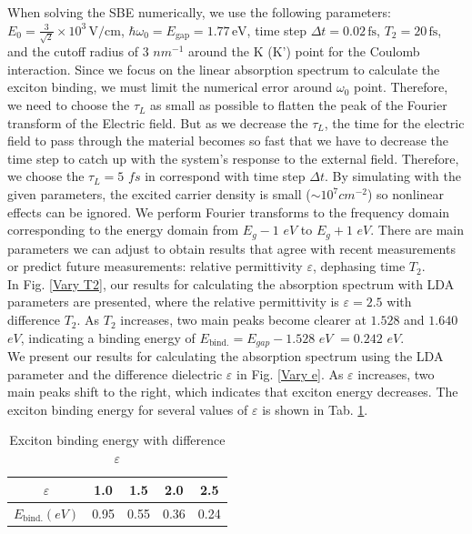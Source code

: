 \documentclass[12pt,english,a4paper]{article}
\begin{document}
\quad When solving the SBE numerically, we use the following parameters: \(E_0 = \frac{3}{\sqrt{2}} \times 10^3 \, \text{V/cm}\), \(\hbar \omega_0 = E_{\text{gap}} = 1.77 \, \text{eV}\), time step \(\Delta t = 0.02 \, \text{fs}\), $ T_2= 20\, \text{fs}$, and the cutoff radius of 3 \(nm^{-1}\) around the K (K') point for the Coulomb interaction. Since we focus on the linear absorption spectrum to calculate the exciton binding, we must limit the numerical error around $\omega_0$ point. Therefore, we need to choose the $\tau_L$ as small as possible to flatten the peak of the Fourier transform of the Electric field. But as we decrease the $\tau_L$, the time for the electric field to pass through the material becomes so fast that we have to decrease the time step to catch up with the system's response to the external field. Therefore, we choose the $\tau_L = 5$ \(fs\) in correspond with time step $\Delta t$. By simulating with the given parameters, the excited carrier density is small ($\sim 10^7 cm^{-2}$) so nonlinear effects can be ignored. We perform Fourier transforms to the frequency domain corresponding to the energy domain from $E_g - 1$ \(eV\) to $E_g + 1$ \(eV\). There are main parameters we can adjust to obtain results that agree with recent measurements or predict future measurements: relative permittivity \(\varepsilon\), dephasing time \(T_2\).\\\null
\quad In Fig. \ref{Vary T2}, our results for calculating the absorption spectrum with LDA parameters are presented, where the relative permittivity is $\varepsilon = 2.5$ with difference $T_2$. As $T_2$ increases, two main peaks become clearer at $1.528$ and $1.640$ \(eV\), indicating a binding energy of $E_{\mathrm{bind.}} = E_{gap} - 1.528$ \(eV\) $= 0.242$ \(eV\).\\ \null
\quad We present our results for calculating the absorption spectrum using the LDA parameter and the difference dielectric $\varepsilon$ in Fig. \ref{Vary e}. As $\varepsilon$ increases, two main peaks shift to the right, which indicates that exciton energy decreases. The exciton binding energy for several values of $\varepsilon$ is shown in Tab. \ref{Binding table}.\\\null
\begin{table}[h]
	\begin{center}
		\begin{tabular}{| c | c | c | c | c|}
			\hline
			$\varepsilon$ & 1.0 & 1.5 & 2.0 & 2.5\\\hline
			$E_{\mathrm{bind.}} (eV)$ & 0.95 & 0.55 & 0.36 & 0.24\\\hline
		\end{tabular}
		\caption[Exciton binding energy with difference $\varepsilon$]{Exciton binding energy with difference $\varepsilon$}
		\label{Binding table}
	\end{center}
\end{table}
\end{document}
